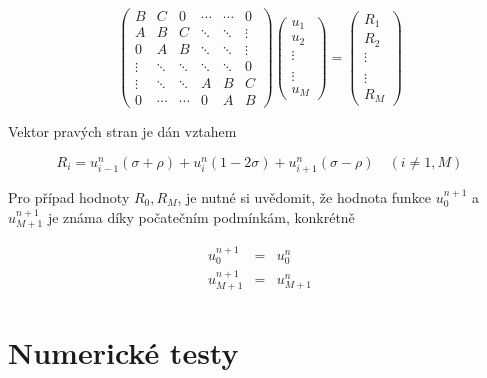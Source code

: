 \begin{equation}
\begin{pmatrix}
B & C & 0 & \cdots & \cdots & 0 \\
A & B & C & \ddots & \ddots & \vdots \\
0 & A & B & \ddots & \ddots & \vdots \\
\vdots & \ddots & \ddots & \ddots & \ddots & 0\\
\vdots & \ddots & \ddots & A & B & C \\
0 & \cdots & \cdots & 0 & A & B 
\end{pmatrix}
\begin{pmatrix}
u_1 \\ u_2 \\ \vdots \\ \\ \vdots \\ u_{M}
\end{pmatrix}
=
\begin{pmatrix}
R_1 \\ R_2 \\ \vdots \\ \\ \vdots \\ R_M
\end{pmatrix}
\end{equation}

Vektor pravých stran je dán vztahem

\begin{equation}
R_i = u_{i-1}^n(\sigma+\rho) + u_i^n(1-2\sigma)
    + u_{i+1}^n(\sigma-\rho) \quad (i \neq 1,M)
\end{equation}

Pro případ hodnoty $R_0, R_M$, je nutné si uvědomit, že hodnota funkce 
$u_{0}^{n+1}$ a $u_{M+1}^{n+1}$ je známa díky počatečním podmínkám, konkrétně

\begin{eqnarray}
u_{0}^{n+1} & = & u_{0}^{n} \\
u_{M+1}^{n+1} & = & u_{M+1}^{n} 
\end{eqnarray}

\section{Numerické testy}

